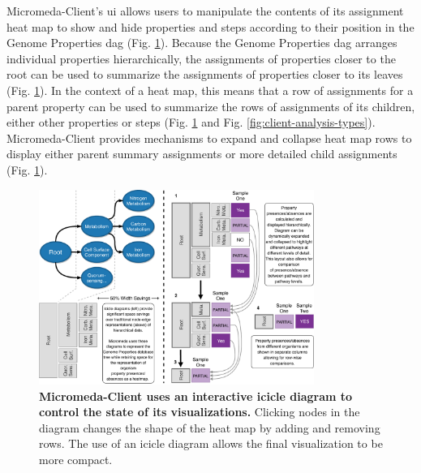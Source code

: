 Micromeda-Client's \gls{ui} allows users to manipulate the contents of its 
assignment heat map to show and hide properties and steps according to their 
position in the Genome Properties \gls{dag} \cite{richardson2018genome} (Fig. 
\ref{fig:visualization-philosophy}). Because the Genome Properties \gls{dag} 
arranges individual properties hierarchically, the assignments of properties 
closer to the root can be used to summarize the assignments of properties closer 
to its leaves (Fig. \ref{fig:visualization-philosophy}). In the context of a 
heat map, this means that a row of assignments for a parent property can be used 
to summarize the rows of assignments of its children, either other properties or 
steps (Fig. \ref{fig:visualization-philosophy} and Fig. 
\ref{fig:client-analysis-types}). Micromeda-Client provides mechanisms to expand 
and collapse heat map rows to display either parent summary assignments or more 
detailed child assignments (Fig. \ref{fig:visualization-philosophy}).

\begin{figure}[!ht]
  \centering
	\includegraphics[width=0.8\textwidth]{media/visualization_design_philosphy.pdf}
	 \caption[Micromeda-Client uses an interactive icicle diagram to control the 
state of its visualizations.]{\textbf{Micromeda-Client uses an interactive 
icicle diagram to control the state of its visualizations.} Clicking nodes in 
the diagram changes the shape of the heat map by adding and removing rows. The 
use of an icicle diagram allows the final visualization to be more compact.}
	 \label{fig:visualization-philosophy}
\end{figure}


